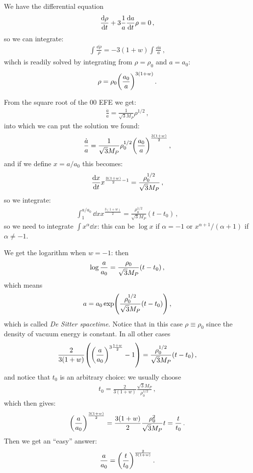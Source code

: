 \documentclass[main.tex]{subfiles}
\begin{document}
We have the differential equation 
%
\begin{align}
\dv{\rho }{t} + 3 \frac{1}{a} \dv{a}{t} (1+w)\rho =0
\,,
\end{align}
%
so we can integrate: 
%
\begin{align}
\int \frac{ \dd{\rho }}{\rho } = - 3 (1+w) \int \frac{ \dd{a}}{a}
\,,
\end{align}
%
wihch is readily solved by integrating from \(\rho =\rho_0 \) and \(a=a_0 \):
%
\begin{align}
\rho = \rho_0 \qty(\frac{a_0 }{a})^{3 (1+w)}
\,.
\end{align}
%

From the square root of the 00 EFE we get: 
%
\begin{align}
\frac{\dot{a}}{a} = \frac{1}{\sqrt{3}M_P} \rho^{1/2}
\,,
\end{align}
%
into which we can put the solution we found: 
%
\begin{align}
\frac{\dot{a}}{a} = \frac{1}{\sqrt{3}M_P} \rho_0^{1/2} \qty(\frac{a_0 }{a})^{\frac{3(1+w)}{2}}
\,,
\end{align}
%
and if we define \(x = a / a_0 \) this becomes: 
%
\begin{align}
\dv{x}{t} x^{\frac{3(1+w)}{2} - 1} = \frac{\rho_0 ^{1/2}}{\sqrt{3}M_P}
\,,
\end{align}
%
so we integrate: 
%
\begin{align}
\int_{1}^{a / a_0 } \dd{x} x^{\frac{3(1+w)}{2}} = 
\frac{\rho_0^{1/2}}{\sqrt{3}M_P} (t-t_0 )
\,,
\end{align}
%
so we need to integrate \(\int x^{\alpha } \dd{x}\): this can be \(\log x\) if \(\alpha = -1\) or \(x^{\alpha +1} / (\alpha +1)\) if \(\alpha \neq -1\). 

We get the logarithm when \(w = -1\): then 
%
\begin{align}
\log \frac{a}{a_0 }  = \frac{\rho_0}{\sqrt{3}M_P} \qty(t - t_0 )
\,,
\end{align}
%
which means 
%
\begin{align}
a = a_0 \exp(\frac{\rho_0^{1/2}}{\sqrt{3}M_P} \qty(t - t_0 ))
\,,
\end{align}
%
which is called \emph{De Sitter spacetime}. Notice that in this case \(\rho \equiv \rho_0 \) since the density of vacuum energy is constant. In all other cases 
%
\begin{align}
\frac{2}{3 (1+w)} \qty(\qty(\frac{a}{a_0 })^{3\frac{1+w}{2}} -1) = \frac{\rho_0^{1/2}}{\sqrt{3}M_P} \qty(t - t_0 )
\,,
\end{align}
%
and notice that \(t_0 \) is an arbitrary choice: we usually choose 
%
\begin{align}
t_0 = \frac{2}{3 (1+w)} \frac{\sqrt{3}M_P}{\rho_0^{1/2}}
\,,
\end{align}
%
which then gives: 
%
\begin{align}
\qty(\frac{a}{a_0 })^{\frac{3 (1+w)}{2}} = \frac{3 (1+w)}{2} \frac{\rho_0^2 }{\sqrt{3}M_P} t = \frac{t}{t_0 }
\,.
\end{align}
%
Then we get an ``easy'' answer: 
%
\begin{align}
\frac{a}{a_0 } = \qty(\frac{t}{t_0 })^{\frac{2}{3 (1+w)}} 
\,.
\end{align}
\end{document}

